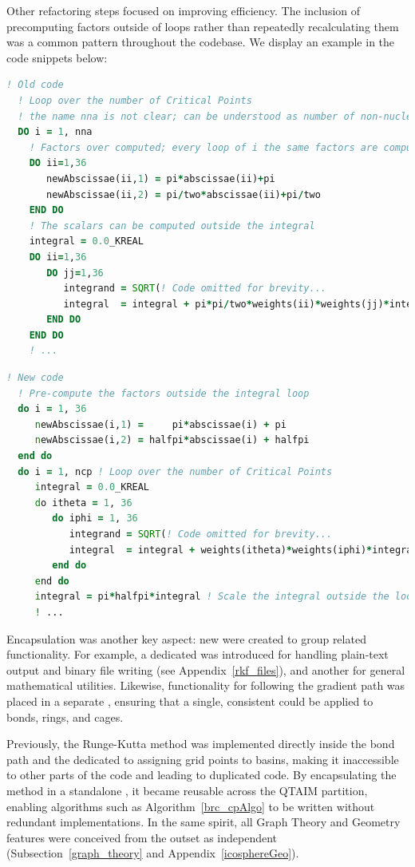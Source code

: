 \newpage
Other refactoring steps focused on improving efficiency. The inclusion of
precomputing factors outside of loops rather than repeatedly recalculating them
was a common pattern throughout the codebase.  We display an example in the
code snippets below:

\begin{lstlisting}[language=Fortran]
  ! Old code
  ! Loop over the number of Critical Points
  ! the name nna is not clear; can be understood as number of non-nuclear attractors]
  DO i = 1, nna 
    ! Factors over computed; every loop of i the same factors are computed
    DO ii=1,36
       newAbscissae(ii,1) = pi*abscissae(ii)+pi
       newAbscissae(ii,2) = pi/two*abscissae(ii)+pi/two
    END DO
    ! The scalars can be computed outside the integral
    integral = 0.0_KREAL 
    DO ii=1,36
       DO jj=1,36
          integrand = SQRT(! Code omitted for brevity...
          integral  = integral + pi*pi/two*weights(ii)*weights(jj)*integrand 
       END DO
    END DO 
    ! ...
\end{lstlisting}

\begin{lstlisting}[language=Fortran]
  ! New code
  ! Pre-compute the factors outside the integral loop
  do i = 1, 36
     newAbscissae(i,1) =     pi*abscissae(i) + pi
     newAbscissae(i,2) = halfpi*abscissae(i) + halfpi
  end do
  do i = 1, ncp ! Loop over the number of Critical Points
     integral = 0.0_KREAL
     do itheta = 1, 36
        do iphi = 1, 36
           integrand = SQRT(! Code omitted for brevity...
           integral  = integral + weights(itheta)*weights(iphi)*integrand
        end do
     end do
     integral = pi*halfpi*integral ! Scale the integral outside the loop
     ! ...
\end{lstlisting}

\newpage
Encapsulation was another key aspect: new \modules were created to group
related functionality. For example, a dedicated \module was introduced for
handling plain-text output and binary file writing (see
Appendix~\ref{rkf_files}), and another \module for general mathematical
utilities. Likewise, functionality for following the gradient path was placed
in a separate \module, ensuring that a single, consistent \subroutine could be
applied to bonds, rings, and cages.

\vspace*{1em}%
Previously, the Runge-Kutta method was implemented directly inside the bond
path \subroutine and the \subroutine dedicated to assigning grid
points to basins, making it inaccessible to other parts of the code and leading
to duplicated code. By encapsulating the method in a standalone \subroutine, it
became reusable across the \gls{QTAIM} partition, enabling algorithms such as
Algorithm~\ref{brc_cpAlgo} to be written without redundant implementations. In
the same spirit, all Graph Theory and Geometry features were conceived from the
outset as independent \modules (Subsection~\ref{graph_theory} and
Appendix~\ref{icosphereGeo}).

